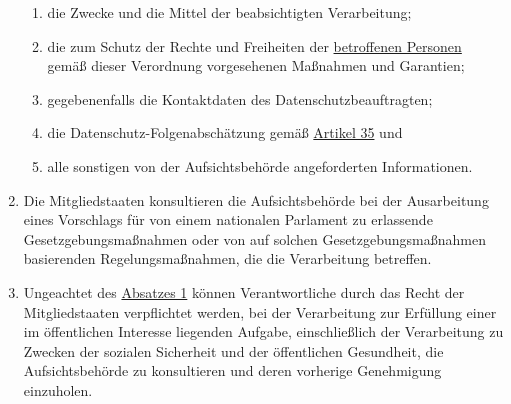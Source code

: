 \begin{enumerate}
\begin{enumerate}
    \item die Zwecke und die Mittel der beabsichtigten Verarbeitung;
    \label{itm:36-3b}

    \item die zum Schutz der Rechte und Freiheiten der \hyperref[itm:04-1]{betroffenen Personen} gemäß dieser Verordnung vorgesehenen
     Maßnahmen und Garantien;
    \label{itm:36-3c}

    \item gegebenenfalls die Kontaktdaten des Datenschutzbeauftragten;
    \label{itm:36-3d}

    \item die Datenschutz-Folgenabschätzung gemäß \hyperref[ch:35]{Artikel 35} und
    \label{itm:36-3e}

    \item alle sonstigen von der Aufsichtsbehörde angeforderten Informationen.
    \label{itm:36-3f}

  \end{enumerate}

  \item Die Mitgliedstaaten konsultieren die Aufsichtsbehörde bei der Ausarbeitung eines Vorschlags für von einem
   nationalen Parlament zu erlassende Gesetzgebungsmaßnahmen oder von auf solchen Gesetzgebungsmaßnahmen basierenden
   Regelungsmaßnahmen, die die Verarbeitung betreffen.
  \label{itm:36-4}

  \item Ungeachtet des \hyperref[itm:36-1]{Absatzes 1} können Verantwortliche durch das Recht der Mitgliedstaaten
   verpflichtet werden, bei der Verarbeitung zur Erfüllung einer im öffentlichen Interesse liegenden Aufgabe,
   einschließlich der Verarbeitung zu Zwecken der sozialen Sicherheit und der öffentlichen Gesundheit, die
   Aufsichtsbehörde zu konsultieren und deren vorherige Genehmigung einzuholen.
  \label{itm:36-5}
   
\end{enumerate}


